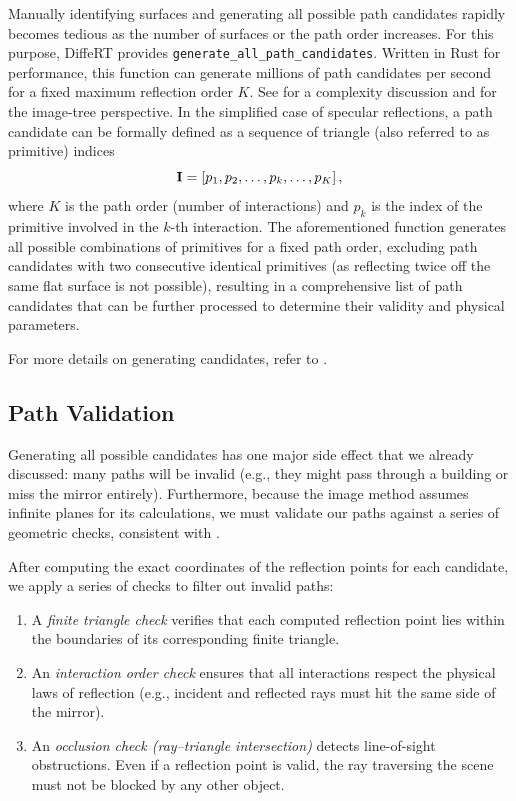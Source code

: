 Manually identifying surfaces and generating all possible path candidates rapidly becomes tedious as the number of surfaces or the path order increases. For this purpose, DiffeRT provides \texttt{generate\_all\_path\_candidates}. Written in Rust for performance, this function can generate millions of path candidates per second for a fixed maximum reflection order $K$. See  for a complexity discussion and  for the image-tree perspective. In the simplified case of specular reflections, a path candidate can be formally defined as a sequence of triangle (also referred to as primitive) indices
\begin{equation}
  \mathbf{I} = \left[p_1, p_2, \ldots, p_k, \ldots, p_K\right],
\end{equation}
where $K$ is the path order (number of interactions) and $p_k$ is the index of the primitive involved in the $k$-th interaction. The aforementioned function generates all possible combinations of primitives for a fixed path order, excluding path candidates with two consecutive identical primitives (as reflecting twice off the same flat surface is not possible), resulting in a comprehensive list of path candidates that can be further processed to determine their validity and physical parameters.

For more details on generating candidates, refer to .

\subsection{Path Validation}

Generating all possible candidates has one major side effect that we already discussed: many paths will be invalid (e.g., they might pass through a building or miss the mirror entirely). Furthermore, because the image method assumes infinite planes for its calculations, we must validate our paths against a series of geometric checks, consistent with .

After computing the exact coordinates of the reflection points for each candidate, we apply a series of checks to filter out invalid paths:
\begin{enumerate}
  \item A \emph{finite triangle check} verifies that each computed reflection point lies within the boundaries of its corresponding finite triangle.
  \item An \emph{interaction order check} ensures that all interactions respect the physical laws of reflection (e.g., incident and reflected rays must hit the same side of the mirror).
  \item An \emph{occlusion check (ray--triangle intersection)} detects \gls{line-of-sight} obstructions. Even if a reflection point is valid, the ray traversing the scene must not be blocked by any other object.
\end{enumerate}

